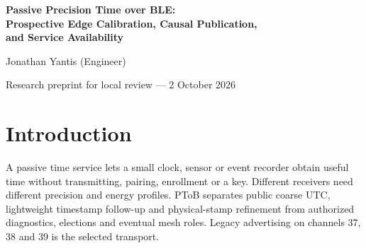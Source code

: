 \documentclass[11pt,letterpaper]{article}
\begin{document}
\thispagestyle{plain}
\begin{center}
{\LARGE\bfseries Passive Precision Time over BLE:\\Prospective Edge Calibration, Causal Publication,\\and Service Availability\par}
\vspace{9pt}Jonathan Yantis (Engineer)\par
{\small Research preprint for local review --- 2 October 2026}
\end{center}
\begin{abstract}
Precision Time over BLE (PToB) investigates passive time distribution across heterogeneous receivers. We distinguish physical reference-edge delay, causal delivered-clock error and service availability. Separate bidirectional ADDRESS/PPS training froze a single 10,516 ns input correction before prospective validation on two nRF52840 clocks. Forward and reverse PPS-shadow measurements gave uncentered RMS 70.197 and 76.359 ns, MAE 57.263 and 60.376 ns, and absolute P99 158 and 219 ns on 600/600 and 598/599 physical PPS observations. Neither receiver's GPS trained its BLE clock; no validation refit, per-channel correction, centering or outlier removal was used. These MAE, SD and P99 values are numerically below MicroSync's published figures, with different metrology and no independent GPIO or energy comparison. An ESP32-S3 receiver separately achieved 319.5 ns internal causal RMS on all 359 physical targets in a normal 600 s run, while 1123/1198 sampled views exposed a fine published clock. Serving-aware authority selection reduced observed nonserving fallback episodes to 2.000--3.367 s; cold-start error and remaining publication gaps preclude full-service acceptance. The findings support profile-specific edge calibration and explicit causal/availability contracts, while delimiting output, holdover and power qualification still required.
\end{abstract}
\section{Introduction}
A passive time service lets a small clock, sensor or event recorder obtain useful time without transmitting, pairing, enrollment or a key. Different receivers need different precision and energy profiles. PToB separates public coarse UTC, lightweight timestamp follow-up and physical-stamp refinement from authorized diagnostics, elections and eventual mesh roles. Legacy advertising on channels 37, 38 and 39 is the selected transport.
\end{document}
